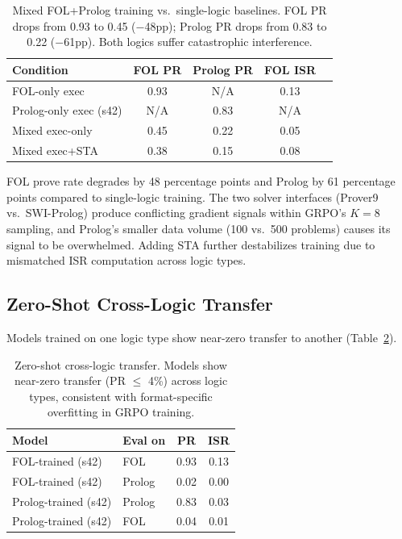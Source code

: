 \documentclass[11pt,a4paper]{article}
\newcommand{\ISR}{\textsc{ISR}}
\newcommand{\GRPO}{\textsc{GRPO}}
\begin{document}
\begin{table}[h]
\centering
\small
\begin{tabular}{lcccc}
\toprule
\textbf{Condition} & \textbf{FOL PR} & \textbf{Prolog PR} & \textbf{FOL \ISR{}} \\
\midrule
FOL-only exec & 0.93 & N/A & 0.13 \\
Prolog-only exec (s42) & N/A & 0.83 & N/A \\
Mixed exec-only & 0.45 & 0.22 & 0.05 \\
Mixed exec+STA & 0.38 & 0.15 & 0.08 \\
\bottomrule
\end{tabular}
\caption{Mixed FOL+Prolog training vs.\ single-logic baselines. FOL PR drops from 0.93 to 0.45 ($-$48pp); Prolog PR drops from 0.83 to 0.22 ($-$61pp). Both logics suffer catastrophic interference.}
\label{tab:mixed}
\end{table}

FOL prove rate degrades by 48 percentage points and Prolog by 61 percentage points compared to single-logic training. The two solver interfaces (Prover9 vs.\ SWI-Prolog) produce conflicting gradient signals within \GRPO{}'s $K{=}8$ sampling, and Prolog's smaller data volume (100 vs.\ 500 problems) causes its signal to be overwhelmed. Adding STA further destabilizes training due to mismatched ISR computation across logic types.

\subsection{Zero-Shot Cross-Logic Transfer}

Models trained on one logic type show near-zero transfer to another (Table~\ref{tab:transfer}).

\begin{table}[h]
\centering
\small
\begin{tabular}{llcc}
\toprule
\textbf{Model} & \textbf{Eval on} & \textbf{PR} & \textbf{\ISR{}} \\
\midrule
FOL-trained (s42) & FOL & 0.93 & 0.13 \\
FOL-trained (s42) & Prolog & 0.02 & 0.00 \\
Prolog-trained (s42) & Prolog & 0.83 & 0.03 \\
Prolog-trained (s42) & FOL & 0.04 & 0.01 \\
\bottomrule
\end{tabular}
\caption{Zero-shot cross-logic transfer. Models show near-zero transfer (PR $\leq$ 4\%) across logic types, consistent with format-specific overfitting in \GRPO{} training.}
\label{tab:transfer}
\end{table}
\end{document}
